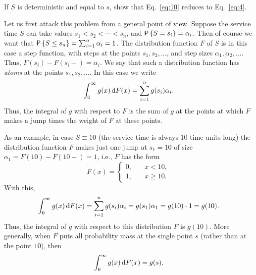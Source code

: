 \begin{question}
  If $S$ is deterministic and equal to $s$, show that
  Eq.~\eqref{eq:10} reduces to Eq.~\eqref{eq:4}.  

  \begin{hint}
    
  \end{hint}

  \begin{solution}

    Let us first attack this problem from a general point of
    view. Suppose the service time $S$ can take values
    $s_1<s_2<\cdots <s_n$, and $\P{S=s_i}=\alpha_i$. Then of course we
    want that $\P{S\leq s_n} = \sum_{i=1}^n \alpha_i = 1$. The
    distribution function $F$ of $S$ is in this case a step function,
    with steps at the points $s_1, s_2, \ldots$, and step sizes
    $\alpha_1, \alpha_2, \ldots$. Thus, $F(s_i)-F(s_i-)=\alpha_i$. We
    say that such a distribution function has \emph{atoms} at the
    points $s_1, s_2, \ldots$. In this case we write
  \begin{equation*}
    \int_0^\infty g(x) \,\text{d}F(x) = \sum_{i=1}^n g(s_i) \alpha_i.
  \end{equation*}
  Thus, the integral of $g$ with respect to $F$ is the sum of $g$ at
  the points at which $F$ makes a jump times the weight of $F$ at
  these points. 


  As an example, in case $S\equiv 10$ (the service time is always 10
  time units long) the distribution function $F$ makes just one jump
  at $s_1=10$ of size $\alpha_1 = F(10)-F(10-) =1$, i.e., $F$ has the
  form
    \begin{equation*}
      F(x) = 
      \begin{cases}
        0, &\quad x< 10, \\
        1, &\quad x\geq 10.
      \end{cases}
    \end{equation*}
With this, 
\begin{equation*}
  \int_0^\infty g(x) \,\text{d}F(x) = \sum_{i=1}^n g(s_i) \alpha_i = g(s_1) \alpha_1 = g(10) \cdot 1 = g(10).
\end{equation*}
Thus, the integral of $g$ with respect to this distribution $F$ is
$g(10)$.  More generally, when $F$ puts all probability mass at the
single point $s$ (rather than at the point $10$), then
\begin{equation*}
  \int_0^\infty g(x) \,\text{d}F(x) = g(s).
\end{equation*}


\end{solution}
\end{question}
